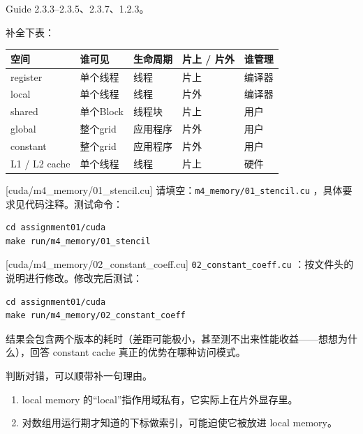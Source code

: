 \documentclass[11pt,a4paper,fontset=none]{ctexart}
\begin{document}
\begin{reading}
Guide 2.3.3--2.3.5、2.3.7、1.2.3。
\end{reading}

补全下表：

\begin{center}\small
\begin{tabular}{@{}lp{8em}p{7em}p{6em}p{8em}@{}}
\toprule
空间 & 谁可见 & 生命周期 & 片上 / 片外 & 谁管理 \\
\midrule
register & 单个线程 & 线程 & 片上 & 编译器 \\
local & 单个线程 & 线程 & 片外 & 编译器 \\
shared & 单个Block & 线程块 & 片上 & 用户 \\
global & 整个grid & 应用程序 & 片外 & 用户 \\
constant & 整个grid & 应用程序 & 片外 & 用户 \\
L1 / L2 cache & 单个线程 & 线程 & 片上 & 硬件 \\
\bottomrule
\end{tabular}
\end{center}

[cuda/m4\_memory/01\_stencil.cu]
请填空：\texttt{m4\_memory/01\_stencil.cu} ，具体要求见代码注释。测试命令：

\begin{lstlisting}
cd assignment01/cuda
make run/m4_memory/01_stencil
\end{lstlisting}

[cuda/m4\_memory/02\_constant\_coeff.cu]
\texttt{02\_constant\_coeff.cu} ：按文件头的说明进行修改。修改完后测试：

\begin{lstlisting}
cd assignment01/cuda
make run/m4_memory/02_constant_coeff
\end{lstlisting}

结果会包含两个版本的耗时（差距可能极小，甚至测不出来性能收益——想想为什么），回答 constant cache 真正的优势在哪种访问模式。


判断对错，可以顺带补一句理由。
\begin{enumerate}[label=(\alph*)]
  \item local memory 的“local”指作用域私有，它实际上在片外显存里。
  \item 对数组用运行期才知道的下标做索引，可能迫使它被放进 local memory。
\end{enumerate}
\end{document}
